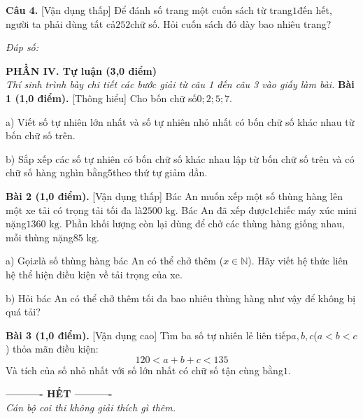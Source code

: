 \documentclass[11pt,a4paper]{article}
\begin{document}
\noindent\textbf{Câu 4.} [Vận dụng thấp] Để đánh số trang một cuốn sách từ trang$1$đến hết, người ta phải dùng tất cả$252$chữ số. Hỏi cuốn sách đó dày bao nhiêu trang?\par\vspace{2pt}
\noindent\textit{Đáp số:} \dotfill\par\vspace{6pt}


\vspace{6pt}
\noindent
\textbf{\large PHẦN IV. Tự luận (3,0 điểm)}\\
\textit{\small Thí sinh trình bày chi tiết các bước giải từ câu 1 đến câu 3 vào giấy làm bài.}
\vspace{6pt}
\noindent\textbf{Bài 1 (1,0 điểm).} [Thông hiểu] Cho bốn chữ số$0; 2; 5; 7$.\par\noindent a) Viết số tự nhiên lớn nhất và số tự nhiên nhỏ nhất có bốn chữ số khác nhau từ bốn chữ số trên.\par\noindent b) Sắp xếp các số tự nhiên có bốn chữ số khác nhau lập từ bốn chữ số trên và có chữ số hàng nghìn bằng$5$theo thứ tự giảm dần.\par\vspace{8pt}

\noindent\textbf{Bài 2 (1,0 điểm).} [Vận dụng thấp] Bác An muốn xếp một số thùng hàng lên một xe tải có trọng tải tối đa là$2500\text{ kg}$. Bác An đã xếp được$1$chiếc máy xúc mini nặng$1360\text{ kg}$. Phần khối lượng còn lại dùng để chở các thùng hàng giống nhau, mỗi thùng nặng$85\text{ kg}$.\par\noindent a) Gọi$x$là số thùng hàng bác An có thể chở thêm ($x \in \mathbb{N}$). Hãy viết hệ thức liên hệ thể hiện điều kiện về tải trọng của xe.\par\noindent b) Hỏi bác An có thể chở thêm tối đa bao nhiêu thùng hàng như vậy để không bị quá tải?\par\vspace{8pt}

\noindent\textbf{Bài 3 (1,0 điểm).} [Vận dụng cao] Tìm ba số tự nhiên lẻ liên tiếp$a, b, c$($a < b < c$) thỏa mãn điều kiện:$$120 < a + b + c < 135$$Và tích của số nhỏ nhất với số lớn nhất có chữ số tận cùng bằng$1$.\par\vspace{8pt}


\begin{center}
\textbf{---------- HẾT ----------}\\
\textit{\small Cán bộ coi thi không giải thích gì thêm.}
\end{center}
\end{document}
